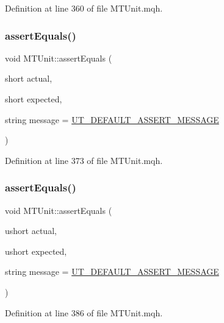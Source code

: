 Definition at line 360 of file M\+T\+Unit.\+mqh.

\mbox{\label{class_m_t_unit_a3e4631314d9541570caecf94f171bf86}} 
\subsubsection{\texorpdfstring{assert\+Equals()}{assertEquals()}\hspace{0.1cm}{\footnotesize\ttfamily [4/28]}}
{\footnotesize\ttfamily void M\+T\+Unit\+::assert\+Equals (\begin{DoxyParamCaption}\item[{short}]{actual,  }\item[{short}]{expected,  }\item[{string}]{message = {\ttfamily \mbox{\hyperlink{_m_t_unit_8mqh_a96f5d62188d09039ebc3f443c9120e39}{U\+T\+\_\+\+D\+E\+F\+A\+U\+L\+T\+\_\+\+A\+S\+S\+E\+R\+T\+\_\+\+M\+E\+S\+S\+A\+GE}}} }\end{DoxyParamCaption})}



Definition at line 373 of file M\+T\+Unit.\+mqh.

\mbox{\label{class_m_t_unit_afb16a1e7cd6da69426eed6077b09e345}} 
\subsubsection{\texorpdfstring{assert\+Equals()}{assertEquals()}\hspace{0.1cm}{\footnotesize\ttfamily [5/28]}}
{\footnotesize\ttfamily void M\+T\+Unit\+::assert\+Equals (\begin{DoxyParamCaption}\item[{ushort}]{actual,  }\item[{ushort}]{expected,  }\item[{string}]{message = {\ttfamily \mbox{\hyperlink{_m_t_unit_8mqh_a96f5d62188d09039ebc3f443c9120e39}{U\+T\+\_\+\+D\+E\+F\+A\+U\+L\+T\+\_\+\+A\+S\+S\+E\+R\+T\+\_\+\+M\+E\+S\+S\+A\+GE}}} }\end{DoxyParamCaption})}



Definition at line 386 of file M\+T\+Unit.\+mqh.

